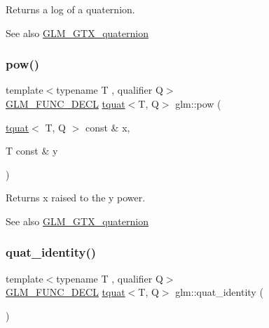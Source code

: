 Returns a log of a quaternion.

\begin{DoxySeeAlso}{See also}
\mbox{\hyperlink{group__gtx__quaternion}{G\+L\+M\+\_\+\+G\+T\+X\+\_\+quaternion}} 
\end{DoxySeeAlso}
\mbox{\label{group__gtx__quaternion_gad382fc37392d537aecf2245a4597d8a3}} 
\subsubsection{\texorpdfstring{pow()}{pow()}}
{\footnotesize\ttfamily template$<$typename T , qualifier Q$>$ \\
\mbox{\hyperlink{setup_8hpp_ab2d052de21a70539923e9bcbf6e83a51}{G\+L\+M\+\_\+\+F\+U\+N\+C\+\_\+\+D\+E\+CL}} \mbox{\hyperlink{structglm_1_1tquat}{tquat}}$<$T, Q$>$ glm\+::pow (\begin{DoxyParamCaption}\item[{\mbox{\hyperlink{structglm_1_1tquat}{tquat}}$<$ T, Q $>$ const \&}]{x,  }\item[{T const \&}]{y }\end{DoxyParamCaption})}

Returns x raised to the y power.

\begin{DoxySeeAlso}{See also}
\mbox{\hyperlink{group__gtx__quaternion}{G\+L\+M\+\_\+\+G\+T\+X\+\_\+quaternion}} 
\end{DoxySeeAlso}
\mbox{\label{group__gtx__quaternion_ga40788ce1d74fac29fa000af893a3ceb5}} 
\subsubsection{\texorpdfstring{quat\+\_\+identity()}{quat\_identity()}}
{\footnotesize\ttfamily template$<$typename T , qualifier Q$>$ \\
\mbox{\hyperlink{setup_8hpp_ab2d052de21a70539923e9bcbf6e83a51}{G\+L\+M\+\_\+\+F\+U\+N\+C\+\_\+\+D\+E\+CL}} \mbox{\hyperlink{structglm_1_1tquat}{tquat}}$<$T, Q$>$ glm\+::quat\+\_\+identity (\begin{DoxyParamCaption}{ }\end{DoxyParamCaption})}

